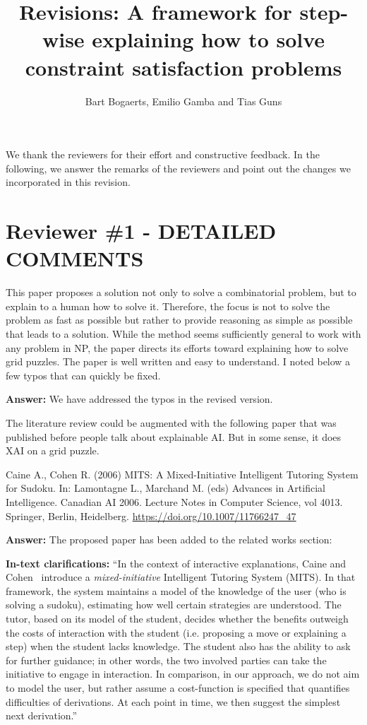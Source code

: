 \documentclass{article}
\title{Revisions: A framework for step-wise explaining how to solve constraint satisfaction problems}
\author{Bart Bogaerts, Emilio Gamba and Tias Guns}
\date{}
\newcommand\comment[1]{\marginpar{\tiny #1}}
\renewcommand\comment[1]{#1}
\newcommand{\tias}[1]{{\comment{\color{blue}\textsc{TG:}#1}}}
\newcommand{\answer}[1]{{\comment{\textbf{Answer:} #1}}}
\newcommand{\clarification}[1]{{\comment{\textbf{In-text clarifications:} #1}}}
\begin{document}
	\maketitle
We thank the reviewers for their effort and constructive feedback. In the following, we answer the remarks of the reviewers and point out the changes we incorporated in this revision.

\section*{Reviewer \#1 - DETAILED COMMENTS}

\begin{quoteit}
	This paper proposes a solution not only to solve a combinatorial
	problem, but to explain to a human how to solve it. Therefore, the
	focus is not to solve the problem as fast as possible but rather to
	provide reasoning as simple as possible that leads to a solution. While
	the method seems sufficiently general to work with any problem in NP,
	the paper directs its efforts toward explaining how to solve grid
	puzzles.
The paper is well written and easy to understand. I noted below a few typos that can quickly be fixed.
\end{quoteit}

\answer{We have addressed the typos in the revised version.}

\begin{quoteit}
The literature review could be augmented with the following paper that was published before people talk about explainable AI. But in some sense, it does XAI on a grid puzzle.

Caine A., Cohen R. (2006) MITS: A Mixed-Initiative Intelligent Tutoring System for Sudoku. In: Lamontagne L., Marchand M. (eds) Advances in Artificial Intelligence. Canadian AI 2006. Lecture Notes in Computer Science, vol 4013. Springer, Berlin, Heidelberg. \url{https://doi.org/10.1007/11766247_47}
\end{quoteit}

\answer{The proposed paper has been added to the related works section:}

\clarification{``In the context of interactive explanations, Caine and Cohen~\cite{caine2006mits} introduce a \emph{mixed-initiative} Intelligent Tutoring System (MITS). 
	In that framework, the system maintains a model of the knowledge of the user (who is solving a sudoku), estimating how well certain strategies are understood. 
	The tutor, based on its model of the student, decides whether the benefits outweigh the costs of interaction with the student (i.e. proposing a move or explaining a step) when the student lacks knowledge. The student also has the ability to ask for further guidance; in other words, the two involved parties can take the initiative to engage in interaction. In comparison, in our approach, we do not aim to model the user, but rather assume a cost-function is specified that quantifies difficulties of derivations. At each point in time, we then suggest the simplest next derivation.''} 
\end{document}
